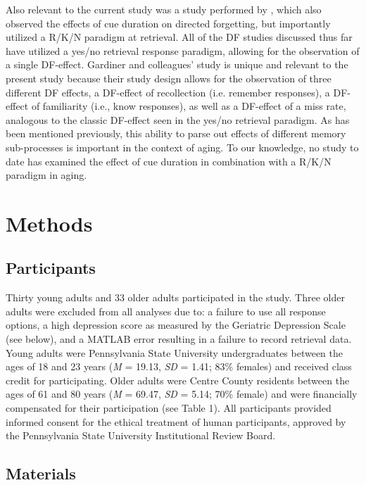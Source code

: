 \documentclass[man]{apa6}\usepackage[]{graphicx}\usepackage[]{color}
\begin{document}
Also relevant to the current study was a study performed by \textcite{gardiner.gawlik.richardson1994}, which also observed the effects of cue duration on directed forgetting, but importantly utilized a R/K/N paradigm at retrieval. All of the DF studies discussed thus far have utilized a yes/no retrieval response paradigm, allowing for the observation of a single DF-effect. Gardiner and colleagues’ study is unique and relevant to the present study because their study design allows for the observation of three different DF effects, a DF-effect of recollection (i.e. remember responses), a DF-effect of familiarity (i.e., know responses), as well as a DF-effect of a miss rate, analogous to the classic DF-effect seen in the yes/no retrieval paradigm. As has been mentioned previously, this ability to parse out effects of different memory sub-processes is important in the context of aging. To our knowledge, no study to date has examined the effect of cue duration in combination with a R/K/N paradigm in aging.


\section*{Methods}

\subsection*{Participants}






Thirty young adults and 33 older adults participated in the study. Three older adults were excluded from all analyses due to: a failure to use all response options, a high depression score as measured by the Geriatric Depression Scale (see below), and a MATLAB error resulting in a failure to record retrieval data. Young adults were Pennsylvania State University undergraduates between the ages of 18 and 23 years (\textit{M} = 19.13, \textit{SD} = 1.41; 83\% females) and received class credit for participating. Older adults were Centre County residents between the ages of 61 and 80 years (\textit{M} = 69.47, \textit{SD} = 5.14; 70\% female) and were financially compensated for their participation (see Table 1). All participants provided informed consent for the ethical treatment of human participants, approved by the Pennsylvania State University Institutional Review Board.

\subsection*{Materials}
\end{document}
